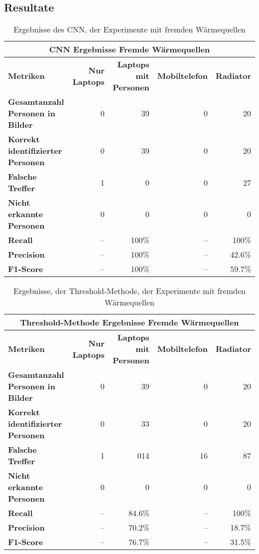 \subsection{Resultate}

{
	\renewcommand{\arraystretch}{1.3}
	\begin{table}[H]
		\centering
		\scriptsize
		\begin{tabularx}{.9\textwidth}{Xrrrr}
			\hline
			\multicolumn{5}{c}{\textbf{\gls{CNN} Ergebnisse Fremde Wärmequellen}}\\
			\hline
			\textbf{Metriken} & \textbf{Nur Laptops} & \textbf{Laptops mit Personen} & \textbf{Mobiltelefon} & \textbf{Radiator}\\
			\hline 
			\textbf{Gesamtanzahl Personen in Bilder} & 0 & 39 & 0 & 20\\
			\hline
			\textbf{Korrekt identifizierter Personen} & 0 & 39 & 0 & 20\\
			\hline
			\textbf{Falsche Treffer} & 1 & 0 & 0 & 27\\
			\hline
			\textbf{Nicht erkannte Personen} & 0 & 0 & 0 & 0\\
			\hline
			\textbf{Recall} & -- & 100\% & -- & 100\%\\
			\hline  
			\textbf{Precision} & -- & 100\% & -- & 42.6\%\\
			\hline
			\textbf{F1-Score} & -- & 100\% & -- & 59.7\%\\
			\hline
		\end{tabularx}
		\caption{Ergebnisse des \gls{CNN}, der Experimente mit fremden Wärmequellen}
		\label{tbl:heatSourcesCNN}
	\end{table}
	\begin{table}[H]
		\centering
		\scriptsize
		\begin{tabularx}{.9\textwidth}{Xrrrr}
			\hline
			\multicolumn{5}{c}{\textbf{Threshold-Methode Ergebnisse Fremde Wärmequellen}}\\
			\hline
			\textbf{Metriken} & \textbf{Nur Laptops} & \textbf{Laptops mit Personen} & \textbf{Mobiltelefon} & \textbf{Radiator}\\
			\hline 
			\textbf{Gesamtanzahl Personen in Bilder} & 0 & 39 & 0 & 20\\
			\hline
			\textbf{Korrekt identifizierter Personen} & 0 & 33 & 0 & 20\\
			\hline
			\textbf{Falsche Treffer} & 1 & 014 & 16 & 87\\
			\hline
			\textbf{Nicht erkannte Personen} & 0 & 0 & 0 & 0\\
			\hline
			\textbf{Recall} & -- & 84.6\% & -- & 100\%\\
			\hline  
			\textbf{Precision} & -- & 70.2\% & -- & 18.7\%\\
			\hline
			\textbf{F1-Score} & -- & 76.7\% & -- & 31.5\%\\
			\hline
		\end{tabularx}
		\caption{Ergebnisse, der Threshold-Methode, der Experimente mit fremden Wärmequellen}
		\label{tbl:heatSourcesThresh}
	\end{table}
}

